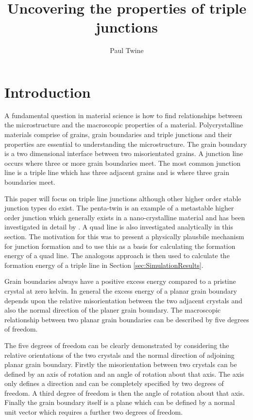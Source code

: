 \documentclass[12pt,a4paper]{book}
\begin{document}
\title{Uncovering the properties of triple junctions}
\author{Paul Twine}

\maketitle

\tableofcontents

\chapter{Introduction} \label{ch:Intro}

A fundamental question in material science is how to find relationships between the microstructure and the macroscopic properties of a material. Polycrystalline materials comprise of grains, grain boundaries and triple junctions and their properties are essential to understanding the microstructure. The grain boundary is a two dimensional interface between two misorientated grains. A junction line occurs where three or more grain boundaries meet. The most common junction line is a triple line which has three adjacent grains and is where three grain boundaries meet. 

This paper will focus on triple line junctions although other higher order stable junction types do exist. The penta-twin is an example of a metastable higher order junction which generally exists in a nano-crystalline material and has been investigated in detail by \cite{Thomas2016}. A quad line is also investigated analytically in this section. The motivation for this was to present a physically plausbile mechanism for junction formation and to use this as a basis for calculating the formation energy of a quad line. The analogous approach is then used to calculate the formation energy of a triple line in Section \ref{sec:SimulationResults}. 

Grain boundaries always have a positive excess energy compared to a pristine crystal at zero kelvin. In general the excess energy of a planar grain boundary depends upon the relative misorientation between the two adjacent crystals and also the normal direction of the planer grain boundary. The macroscopic relationship between two planar grain boundaries can be described by five degrees of freedom. 

The five degrees of freedom can be clearly demonstrated by considering the relative orientations of the two crystals and the normal direction of adjoining planar grain boundary. Firstly the misorientation between two crystals can be defined by an axis of rotation and an angle of rotation about that axis.  The axis only defines a direction and can be completely specified by two degrees of freedom. A third degree of freedom is then the angle of rotation about that axis. Finally the grain boundary itself is a plane which can be defined by a normal unit vector which requires a further two degrees of freedom.
\end{document}
